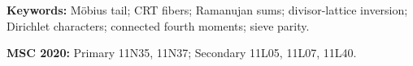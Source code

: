 \documentclass[11pt]{article}
\theoremstyle{definition}
\theoremstyle{remark}
\begin{document}
\noindent\textbf{Keywords:} M\"obius tail; CRT fibers; Ramanujan sums;
divisor-lattice inversion; Dirichlet characters; connected fourth moments;
sieve parity.

\medskip
\noindent\textbf{MSC 2020:} Primary 11N35, 11N37; Secondary
11L05, 11L07, 11L40.











\begingroup
\footnotesize


\endgroup
\end{document}
